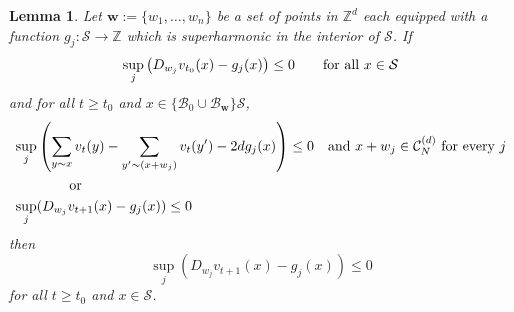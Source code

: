 \documentclass[12pt]{amsart}
\newtheorem{lemma}[theorem]{Lemma}
\newcommand{\Z}{\mathbb{Z}}
\begin{document}
	\begin{lemma} \label{general_difference_comparison}
		Let  $\mathbf{w} := \{w_1, \ldots, w_n\}$ be a set of points in $\Z^d$ each equipped with a function $g_j: \mathcal{S} \to \Z$ which is superharmonic in the interior of $\mathcal{S}$. If	
		\begin{equation}
		\label{eq:initial_cond} \sup_{j} \left( D_{w_j} v_{t_0}(x) - g_j(x) \right)  \leq 0 \mbox{\qquad for all $x \in \mathcal{S}$}
		\end{equation}
		and for all $t \geq t_0$ and $x \in \{\mathcal{B}_0 \cup \mathcal{B}_{\mathbf{w}}\} \mathcal{S}$,
		\begin{equation} \label{eq:boundaries_ref}
		\begin{aligned}
		\sup_j &\left(\sum_{y\sim x}v_t(y)-\sum_{y'\sim(x+w_j)}v_t(y')
        -2d g_j(x)\right)\leq0
        \quad\mbox{and $x+w_j\in\mathcal C_N^{(d)}$ for every $j$}\\
		&\mbox{  \qquad or } \\
		\sup_{j}  &( D_{w_j} v_{t+1}(x) - g_j(x) ) \leq 0
		 \end{aligned}
		\end{equation}
		then
		\begin{equation} \label{eq:derivative_comparison}
		\sup_{j} \left( D_{w_j} v_{t+1}(x) - g_j(x) \right) \leq 0
		\end{equation}
		for all $t \geq t_0$ and $x \in \mathcal{S}$. 
		
	\end{lemma}
	
\end{document}
